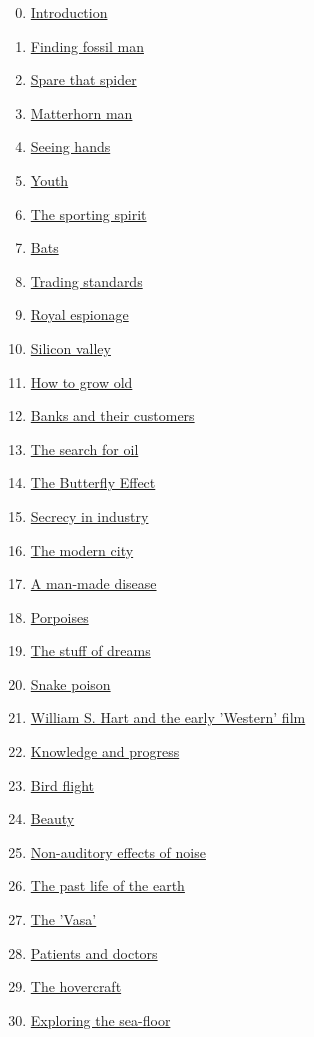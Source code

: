 \documentclass[11pt]{article}
\begin{document}
\begin{multicols}{2}
	\begin{enumerate}
		\setcounter{enumi}{-1}
		\item \href{URL}{Introduction}	%
		\item \href{URL}{Finding fossil man}	%
		\item \href{URL}{Spare that spider}	%
		\item \href{URL}{Matterhorn man}	%
		\item \href{URL}{Seeing hands}	%
		\item \href{URL}{Youth}	%
		\item \href{URL}{The sporting spirit}	%
		\item \href{URL}{Bats}	%
		\item \href{URL}{Trading standards}	%
		\item \href{URL}{Royal espionage}	%
		\item \href{URL}{Silicon valley}	%
		\item \href{URL}{How to grow old}	%
		\item \href{URL}{Banks and their customers}	%
		\item \href{URL}{The search for oil}	%
		\item \href{URL}{The Butterfly Effect}	%
		\item \href{URL}{Secrecy in industry}	%
		\item \href{URL}{The modern city}	%
		\item \href{URL}{A man-made disease}	%
		\item \href{URL}{Porpoises}	%
		\item \href{URL}{The stuff of dreams}	%
		\item \href{URL}{Snake poison}	%
		\item \href{URL}{William S. Hart and the early 'Western' film}	%
		\item \href{URL}{Knowledge and progress}	%
		\item \href{URL}{Bird flight}	%
		\item \href{URL}{Beauty}	%
		\item \href{URL}{Non-auditory effects of noise}	%
		\item \href{URL}{The past life of the earth}	%
		\item \href{URL}{The 'Vasa'}	%
		\item \href{URL}{Patients and doctors}	%
		\item \href{URL}{The hovercraft}	%
		\item \href{URL}{Exploring the sea-floor}	%

\end{enumerate}
\end{multicols}
\end{document}
